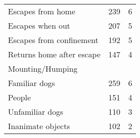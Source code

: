 \documentclass[varwidth=\maxdimen]{standalone}
\newcommand{\subrow}[1]{\hspace{1.25em}#1}
\begin{document}
\begin{tabular}[t]{lrr}
  \subrow{Escapes from home}                   &      239 &               6 \\
  \subrow{Escapes when out}                    &      207 &               5 \\
  \subrow{Escapes from confinement}            &      192 &               5 \\
  \subrow{Returns home after escape}           &      147 &               4 \\
Mounting/Humping \\
  \subrow{Familiar dogs}                       &      259 &               6 \\
  \subrow{People}                              &      151 &               4 \\
  \subrow{Unfamiliar dogs}                     &      110 &               3 \\
  \subrow{Inanimate objects}                   &      102 &               2 \\
\bottomrule
\end{tabular}
\end{document}
